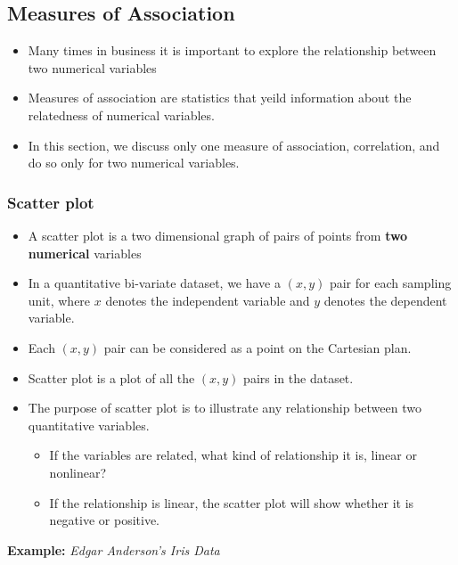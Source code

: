 \documentclass[]{book}
\providecommand{\tightlist}{%
  \setlength{\itemsep}{0pt}\setlength{\parskip}{0pt}}
\begin{document}
\hypertarget{measures-of-association}{%
\subsection{Measures of Association}\label{measures-of-association}}

\begin{itemize}
\tightlist
\item
  Many times in business it is important to explore the relationship between two numerical variables
\item
  Measures of association are statistics that yeild information about the relatedness of numerical variables.
\item
  In this section, we discuss only one measure of association, correlation, and do so only for two numerical variables.
\end{itemize}

\hypertarget{scatter-plot}{%
\subsubsection{Scatter plot}\label{scatter-plot}}

\begin{itemize}
\tightlist
\item
  A scatter plot is a two dimensional graph of pairs of points from \textbf{two numerical} variables
\item
  In a quantitative bi-variate dataset, we have a \((x,y)\) pair for each sampling unit, where \(x\) denotes the independent variable and \(y\) denotes the dependent variable.
\item
  Each \((x,y)\) pair can be considered as a point on the Cartesian plan.
\item
  Scatter plot is a plot of all the \((x,y)\) pairs in the dataset.
\item
  The purpose of scatter plot is to illustrate any relationship between two quantitative variables.

  \begin{itemize}
  \tightlist
  \item
    If the variables are related, what kind of relationship it is, linear or nonlinear?
  \item
    If the relationship is linear, the scatter plot will show whether it is negative or positive.
  \end{itemize}
\end{itemize}

\textbf{Example:} \emph{Edgar Anderson's Iris Data}
\end{document}
